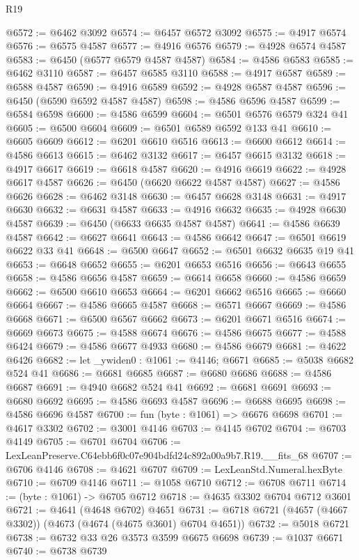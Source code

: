 \begin{lexlean}{R19}
\begin{coremodule}
@6572 := @6462 @3092
@6574 := @6457 @6572 @3092
@6575 := @4917 @6574
@6576 := @6575 @4587
@6577 := @4916 @6576
@6579 := @4928 @6574 @4587
@6583 := @6450 (@6577 @6579 @4587 @4587)
@6584 := @4586 @6583
@6585 := @6462 @3110
@6587 := @6457 @6585 @3110
@6588 := @4917 @6587
@6589 := @6588 @4587
@6590 := @4916 @6589
@6592 := @4928 @6587 @4587
@6596 := @6450 (@6590 @6592 @4587 @4587)
@6598 := @4586 @6596 @4587
@6599 := @6584 @6598
@6600 := @4586 @6599
@6604 := @6501 @6576 @6579 @324 @41
@6605 := @6500 @6604
@6609 := @6501 @6589 @6592 @133 @41
@6610 := @6605 @6609
@6612 := @6201 @6610 @6516
@6613 := @6600 @6612
@6614 := @4586 @6613
@6615 := @6462 @3132
@6617 := @6457 @6615 @3132
@6618 := @4917 @6617
@6619 := @6618 @4587
@6620 := @4916 @6619
@6622 := @4928 @6617 @4587
@6626 := @6450 (@6620 @6622 @4587 @4587)
@6627 := @4586 @6626
@6628 := @6462 @3148
@6630 := @6457 @6628 @3148
@6631 := @4917 @6630
@6632 := @6631 @4587
@6633 := @4916 @6632
@6635 := @4928 @6630 @4587
@6639 := @6450 (@6633 @6635 @4587 @4587)
@6641 := @4586 @6639 @4587
@6642 := @6627 @6641
@6643 := @4586 @6642
@6647 := @6501 @6619 @6622 @33 @41
@6648 := @6500 @6647
@6652 := @6501 @6632 @6635 @19 @41
@6653 := @6648 @6652
@6655 := @6201 @6653 @6516
@6656 := @6643 @6655
@6658 := @4586 @6656 @4587
@6659 := @6614 @6658
@6660 := @4586 @6659
@6662 := @6500 @6610 @6653
@6664 := @6201 @6662 @6516
@6665 := @6660 @6664
@6667 := @4586 @6665 @4587
@6668 := @6571 @6667
@6669 := @4586 @6668
@6671 := @6500 @6567 @6662
@6673 := @6201 @6671 @6516
@6674 := @6669 @6673
@6675 := @4588 @6674
@6676 := @4586 @6675
@6677 := @4588 @6424
@6679 := @4586 @6677 @4933
@6680 := @4586 @6679
@6681 := @4622 @6426
@6682 := let _ywiden0 : @1061 := @4146; @6671
@6685 := @5038 @6682 @524 @41
@6686 := @6681 @6685
@6687 := @6680 @6686
@6688 := @4586 @6687
@6691 := @4940 @6682 @524 @41
@6692 := @6681 @6691
@6693 := @6680 @6692
@6695 := @4586 @6693 @4587
@6696 := @6688 @6695
@6698 := @4586 @6696 @4587
@6700 := fun (byte : @1061) => @6676 @6698
@6701 := @4617 @3302
@6702 := @3001 @4146
@6703 := @4145 @6702
@6704 := @6703 @4149
@6705 := @6701 @6704
@6706 := LexLeanPreserve.C64ebb6f0c07e904bdfd24c892a00a9b7.R19.__fits_68
@6707 := @6706 @4146
@6708 := @4621 @6707
@6709 := LexLeanStd.Numeral.hexByte
@6710 := @6709 @4146
@6711 := @1058 @6710
@6712 := @6708 @6711
@6714 := (byte : @1061) -> @6705 @6712
@6718 := @4635 @3302 @6704 @6712 @3601
@6721 := @4641 (@4648 @6702) @4651
@6731 := @6718 @6721 (@4657 (@4667 @3302)) (@4673 (@4674 (@4675 @3601) @6704 @4651))
@6732 := @5018 @6721
@6738 := @6732 @33 @26 @3573 @3599 @6675 @6698
@6739 := @1037 @6671
@6740 := @6738 @6739

\end{coremodule}
\end{lexlean}
